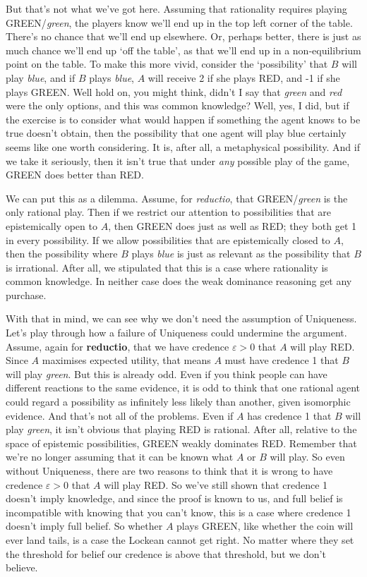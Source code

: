 But that's not what we've got here. Assuming that rationality requires playing GREEN\slash\textit{green}, the players know we'll end up in the top left corner of the table. There's no chance that we'll end up elsewhere. Or, perhaps better, there is just as much chance we'll end up `off the table', as that we'll end up in a non-equilibrium point on the table. To make this more vivid, consider the `possibility' that $B$ will play \textit{blue}, and if $B$ plays \textit{blue}, $A$ will receive 2 if she plays RED, and -1 if she plays GREEN. Well hold on, you might think, didn't I say that \textit{green} and \textit{red} were the only options, and this was common knowledge? Well, yes, I did, but if the exercise is to consider what would happen if something the agent knows to be true doesn't obtain, then the possibility that one agent will play blue certainly seems like one worth considering. It is, after all, a metaphysical possibility. And if we take it seriously, then it isn't true that under \textit{any} possible play of the game, GREEN does better than RED.

We can put this as a dilemma. Assume, for \textit{reductio}, that GREEN\-/\-\textit{green} is the only rational play. Then if we restrict our attention to possibilities that are epistemically open to $A$, then GREEN does just as well as RED; they both get 1 in every possibility. If we allow possibilities that are epistemically closed to $A$, then the possibility where $B$ plays \textit{blue} is just as relevant as the possibility that $B$ is irrational. After all, we stipulated that this is a case where rationality is common knowledge. In neither case does the weak dominance reasoning get any purchase.

With that in mind, we can see why we don't need the assumption of Uniqueness. Let's play through how a failure of Uniqueness could undermine the argument. Assume, again for \textbf{reductio}, that we have credence $\varepsilon > 0$ that $A$ will play RED. Since $A$ maximises expected utility, that means $A$ must have credence 1 that $B$ will play \textit{green}. But this is already odd. Even if you think people can have different reactions to the same evidence, it is odd to think that one rational agent could regard a possibility as infinitely less likely than another, given isomorphic evidence. And that's not all of the problems. Even if $A$ has credence 1 that $B$ will play \textit{green}, it isn't obvious that playing RED is rational. After all, relative to the space of epistemic possibilities, GREEN weakly dominates RED. Remember that we're no longer assuming that it can be known what $A$ or $B$ will play. So even without Uniqueness, there are two reasons to think that it is wrong to have credence $\varepsilon > 0$ that $A$ will play RED. So we've still shown that credence 1 doesn't imply knowledge, and since the proof is known to us, and full belief is incompatible with knowing that you can't know, this is a case where credence 1 doesn't imply full belief. So whether $A$ plays GREEN, like whether the coin will ever land tails, is a case the Lockean cannot get right. No matter where they set the threshold for belief our credence is above that threshold, but we don't believe. 

